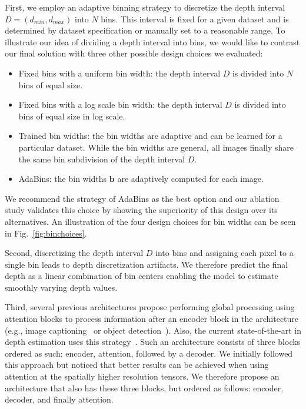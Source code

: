 \documentclass[final]{cvpr}
\begin{document}
First, we employ an adaptive binning strategy to discretize the depth interval $D = (d_{min}, d_{max})$ into $N$ bins. This interval is fixed for a given dataset and is determined by dataset specification or manually set to a reasonable range. To illustrate our idea of dividing a depth interval into bins, we would like to contrast our final solution with three other possible design choices we evaluated: 
%
\begin{itemize}
\item Fixed bins with a uniform bin width: the depth interval $D$ is divided into $N$ bins of equal size.
\item Fixed bins with a log scale bin width: the depth interval $D$ is divided into bins of equal size in log scale.
\item Trained bin widths: the bin widths are adaptive and can be learned for a particular dataset. While the bin widths are general, all images finally share the same bin subdivision of the depth interval $D$.
\item AdaBins: the bin widths $\textbf{b}$ are adaptively computed for each image.
\end{itemize}
%
We recommend the strategy of AdaBins as the best option and our ablation study validates this choice by showing the superiority of this design over its alternatives. An illustration of the four design choices for bin widths can be seen in Fig.~\ref{fig:binchoices}.

Second, discretizing the depth interval $D$ into bins and assigning each pixel to a single bin leads to depth discretization artifacts. We therefore predict the final depth as a linear combination of bin centers enabling the model to estimate smoothly varying depth values. 

Third, several previous architectures propose performing global processing using attention blocks to process information after an encoder block in the architecture (e.g., image captioning~\cite{Cornia_2020_CVPR, transf_obj_NEURIPS2019_680390c5} or object detection~\cite{detr2020}). Also, the current state-of-the-art in depth estimation uses this strategy~\cite{dav_huynh2020guiding}. Such an architecture consists of three blocks ordered as such: encoder, attention, followed by a decoder. We initially followed this approach but noticed that better results can be achieved when using attention at the spatially higher resolution tensors. We therefore propose an architecture that also has these three blocks, but ordered as follows: encoder, decoder, and finally attention.
\end{document}
